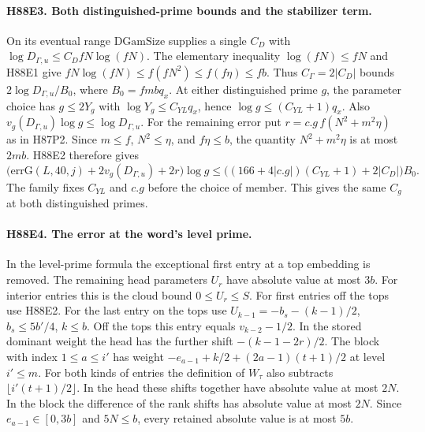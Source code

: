 \paragraph{H88E3. Both distinguished-prime bounds and the stabilizer term.}
On its eventual range $\mathrm{DGamSize}$ supplies a single $C_D$ with
$\log D_{\Gamma,u}\le C_D fN\log(fN)$. The elementary inequality
$\log(fN)\le fN$ and H88E1 give
$fN\log(fN)\le f(fN^2)\le f(f\eta)\le fb$.
Thus $C_\Gamma=2|C_D|$ bounds $2\log D_{\Gamma,u}/B_0$,
where $B_0=fmbq_x$. At either distinguished prime $g$, the parameter
choice has $g\le2Y_g$ with $\log Y_g\le C_{YL}q_x$, hence
$\log g\le(C_{YL}+1)q_x$. Also
$v_g(D_{\Gamma,u})\log g\le\log D_{\Gamma,u}$.
For the remaining error put $r=c.g\,f(N^2+m^2\eta)$ as in H87P2.
Since $m\le f$, $N^2\le\eta$, and $f\eta\le b$, the
quantity $N^2+m^2\eta$ is at most $2mb$. H88E2 therefore gives
\[
 \big(\mathrm{errG}(L,40,j)+2v_g(D_{\Gamma,u})+2r\big)\log g
 \le\big((166+4|c.g|)(C_{YL}+1)+2|C_D|\big)B_0 .
\]
The family fixes $C_{YL}$ and $c.g$ before the choice of member.
This gives the same $C_g$ at both distinguished primes.

\paragraph{H88E4. The error at the word's level prime.}
In the level-prime formula the exceptional first entry at a top
embedding is removed. The remaining head parameters $U_r$ have
absolute value at most $3b$. For interior entries this is the cloud
bound $0\le U_r\le S$. For first entries off the tops use H88E2.
For the last entry on the tops use
$U_{k-1}=-b_s-(k-1)/2$, $b_s\le5b'/4$, $k\le b$.
Off the tops this entry equals $v_{k-2}-1/2$.
In the stored dominant weight the head has the further shift
$-(k-1-2r)/2$. The block with index $1\le a\le i'$ has
weight $-e_{a-1}+k/2+(2a-1)(t+1)/2$ at level $i'\le m$.
For both kinds of entries the definition of $W_\tau$ also subtracts
$\lfloor i'(t+1)/2\rfloor$. In the head these shifts together have
absolute value at most $2N$. In the block the difference of the
rank shifts has absolute value at most $2N$. Since $e_{a-1}\in[0,3b]$
and $5N\le b$, every retained absolute value is at most $5b$.

